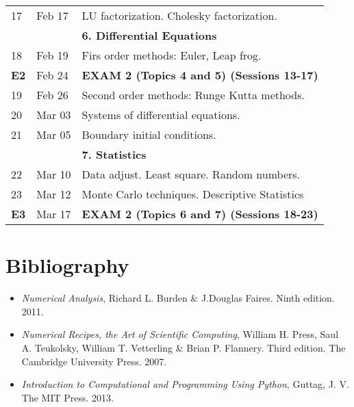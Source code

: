 \documentclass[a4,useAMS,usenatbib,usegraphicx,12pt]{article}
\begin{document}
\begin{table}[!ht]
\begin{small}
\begin{flushleft}
\begin{center}
\begin{tabular}{l  l  l}
	17 & Feb 17& LU factorization. Cholesky factorization. \\
	& & \textbf{6. Differential Equations} \\
	18 & Feb 19& Firs order methods: Euler, Leap frog. \\
	\textbf{E2} & Feb 24& \textbf{EXAM 2 (Topics 4 and 5) (Sessions 13-17)} \\
	19 & Feb 26& Second order methods: Runge Kutta methods. \\
	20 & Mar 03& Systems of differential equations.\\
	21 & Mar 05& Boundary initial conditions.\\
	& & \textbf{7. Statistics} \\
	22 & Mar 10&  Data adjust. Least square. Random numbers.\\
	23 & Mar 12&  Monte Carlo techniques. Descriptive Statistics\\
	\textbf{E3} & Mar 17& \textbf{EXAM 2 (Topics 6 and 7) (Sessions 18-23)} \\
	\hline\hline
  \end{tabular}  
\end{center}
\end{flushleft}
\end{small}
\end{table}

\newpage
\section*{Bibliography}
\begin{itemize}
\item \textit{Numerical Analysis}, Richard L. Burden \& J.Douglas Faires. Ninth edition. 2011.
\item \textit{Numerical Recipes, the Art of Scientific Computing}, William H. Press, Saul A. Teukolsky,
William T. Vetterling \& Brian P. Flannery. Third edition. The Cambridge University Press. 2007.
\item \textit{Introduction to Computational and Programming Using Python}, Guttag, J. V. 
The MIT Press. 2013.
\end{itemize}

\end{document}
